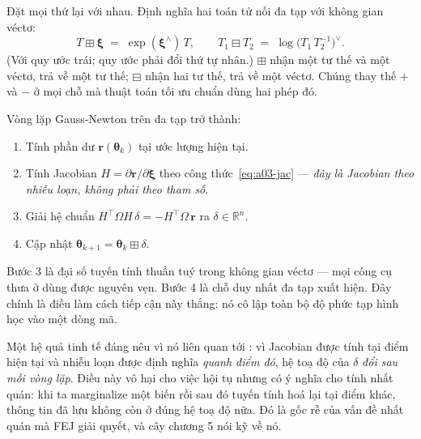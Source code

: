 \documentclass[../../vslam.tex]{subfiles}
\begin{document}
Đặt mọi thứ lại với nhau. Định nghĩa hai toán tử nối đa tạp với không gian véctơ:
\[
T \boxplus \boldsymbol{\xi} \;=\; \exp(\boldsymbol{\xi}^\wedge)\,T,
\qquad
T_1 \boxminus T_2 \;=\; \log\bigl(T_1\,T_2^{-1}\bigr)^\vee .
\]
(Với quy ước trái; quy ước phải đổi thứ tự nhân.) \(\boxplus\) nhận một tư thế và một véctơ, trả về một tư thế; \(\boxminus\) nhận hai tư thế, trả về một véctơ. Chúng thay thế \(+\) và \(-\) ở mọi chỗ mà thuật toán tối ưu chuẩn dùng hai phép đó.

Vòng lặp Gauss-Newton trên đa tạp trở thành:
\begin{enumerate}
\item Tính phần dư \(\mathbf{r}(\boldsymbol{\theta}_k)\) tại ước lượng hiện tại.
\item Tính Jacobian \(H = \partial\mathbf{r}/\partial\boldsymbol{\xi}\) theo công thức~\eqref{eq:a03-jac} --- \emph{đây là Jacobian theo nhiễu loạn, không phải theo tham số}.
\item Giải hệ chuẩn \(H^{\top}\Omega H\,\delta = -H^{\top}\Omega\,\mathbf{r}\) ra \(\delta \in \mathbb{R}^n\).
\item Cập nhật \(\boldsymbol{\theta}_{k+1} = \boldsymbol{\theta}_k \boxplus \delta\).
\end{enumerate}

Bước 3 là đại số tuyến tính thuần tuý trong không gian véctơ --- mọi công cụ thưa ở  dùng được nguyên vẹn. Bước 4 là chỗ duy nhất đa tạp xuất hiện. Đây chính là điều làm cách tiếp cận này thắng: nó cô lập toàn bộ độ phức tạp hình học vào một dòng mã.

Một hệ quả tinh tế đáng nêu vì nó liên quan tới : vì Jacobian được tính tại điểm hiện tại và nhiễu loạn được định nghĩa \emph{quanh điểm đó}, hệ toạ độ của \(\delta\) \emph{đổi sau mỗi vòng lặp}. Điều này vô hại cho việc hội tụ nhưng có ý nghĩa cho tính nhất quán: khi ta marginalize một biến rồi sau đó tuyến tính hoá lại tại điểm khác, thông tin đã lưu không còn ở đúng hệ toạ độ nữa. Đó là gốc rễ của vấn đề nhất quán mà FEJ giải quyết, và cây  chương 5 nói kỹ về nó.

\begin{ungdung}
\end{ungdung}
\end{document}

